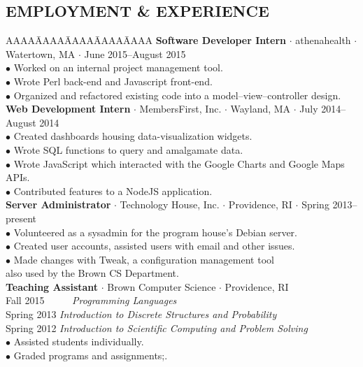 \documentclass{res}
\begin{document}
\begin{resume}
\section{EMPLOYMENT \& EXPERIENCE}
   \myvspace
   \begin{tabbing}
   AAAA\=AAAA\=AAAA\=AAAA\=AAAA\kill
 {\bf Software Developer Intern} $\cdot$ athenahealth $\cdot$ Watertown, MA $\cdot$ June 2015--August 2015\\
 	\>$\bullet$ Worked on an internal project management tool.\\
 	\>$\bullet$ Wrote Perl back-end and Javascript front-end.\\
 	\>$\bullet$ Organized and refactored existing code into a model--view--controller design.\\
 \sbreak
 {\bf Web Development Intern} $\cdot$ MembersFirst, Inc. $\cdot$ Wayland, MA $\cdot$ July 2014--August 2014\\
	\>$\bullet$ Created dashboards housing data-visualization widgets.\\
	\>$\bullet$ Wrote SQL functions to query and amalgamate data.\\
	\>$\bullet$ Wrote JavaScript which interacted with the Google Charts and Google Maps APIs.\\
	\>$\bullet$ Contributed features to a NodeJS application.\\
 \sbreak
 {\bf Server Administrator} $\cdot$ Technology House, Inc. $\cdot$ Providence, RI $\cdot$ Spring 2013--present\\
 	\>$\bullet$ Volunteered as a sysadmin for the program house's Debian server.\\
 	\>$\bullet$ Created user accounts, assisted users with email and other issues.\\
 	\>$\bullet$ Made changes with Tweak, a configuration management tool\\
 		\>\phantom{$\bullet$} also used by the Brown CS Department.\\
 \sbreak
 {\bf Teaching Assistant} $\cdot$ Brown Computer Science $\cdot$ Providence, RI\\
 	\>Fall 2015   ~~~~~{\em Programming Languages}\\
 	\>Spring 2013 {\em Introduction to Discrete Structures and Probability}\\
	\>Spring 2012 {\em Introduction to Scientific Computing and Problem Solving}\\
	\>$\bullet$  Assisted students individually.\\
	\>$\bullet$  Graded programs and assignments;.\\

\end{tabbing}
\end{resume}
\end{document}
